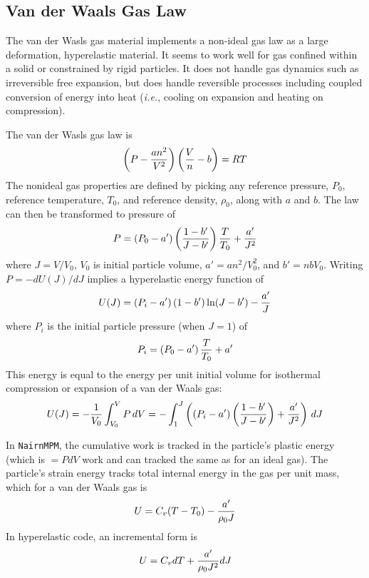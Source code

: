 \documentclass[11pt]{book}
\begin{document}
\subsection{Van der Waals Gas Law}

The van der Wasls gas material implements a non-ideal gas law as a large deformation, hyperelastic material. It seems to work well for gas confined within a solid or constrained by rigid particles. It does not handle gas dynamics such as irreversible free expansion, but does handle reversible processes including coupled conversion of energy into heat ({\em i.e.}, cooling on expansion and heating on compression).

The van der Wasls gas law is
\begin{equation}
    \left(P-{an^2\over V^2}\right)\left({V\over n}-b\right) = RT
\end{equation}
The nonideal gas properties are defined by picking any reference pressure, $P_0$, reference temperature, $T_0$, and reference density, $\rho_0$, along with $a$ and $b$. The law can then be transformed to
pressure of
\begin{equation}
    P = \left(P_0-a'\right)\left(1-b'\over J-b'\right){T\over T_0} + {a'\over J^2}
\end{equation}
where $J = V/V_0$, $V_0$ is initial particle volume, $a'=an^2/V_0^2$, and $b'=nbV_0$. Writing $P = - dU(J)/dJ$ implies a hyperelastic energy function of
\begin{equation}
    U(J) = \left(P_i-a'\right)\left(1-b'\right)\ln (J-b') - {a'\over J}
\end{equation}
where $P_i$ is the initial particle pressure (when $J=1$) of
\begin{equation}
    P_i = \left(P_0-a'\right){T\over T_0} + {a'}
\end{equation}
This energy is equal to the energy per unit initial volume for isothermal compression or expansion of a van der Waals gas:
\begin{equation}
    U(J) = - {1\over V_0} \int_{V_0}^V P\thinspace dV = -  \int_{1}^J \left(\left(P_i-a'\right)\left(1-b'\over J-b'\right) + {a'\over J^2}\right)\thinspace dJ
    \end{equation}

In {\tt NairnMPM}, the cumulative work is tracked in the particle's plastic energy (which is $=PdV$ work and can tracked the same as for an ideal gas). The particle's strain energy tracks total internal energy in the gas per unit mass, which for a van der Waals gas is
\begin{equation}
   U = C_v(T-T_0) - {a'\over  \rho_0 J}
\end{equation}
In hyperelastic code, an incremental form is
\begin{equation}
   U = C_v dT + {a'\over \rho_0 J^2} dJ
\end{equation}
\end{document}
